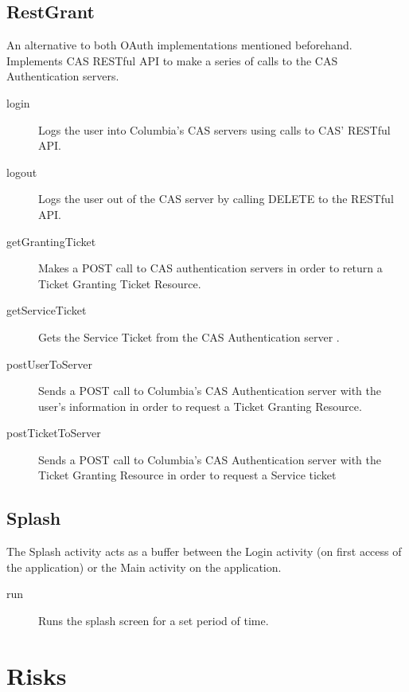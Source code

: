 \documentclass{article}
\begin{document}
\subsection{RestGrant}
An alternative to both OAuth implementations mentioned beforehand. Implements CAS RESTful 
API to make a series of calls to the CAS Authentication servers.
\begin{description}
    \item[login]                Logs the user into Columbia's CAS servers using calls to 
                                CAS' RESTful API.
    \item[logout]               Logs the user out of the CAS server by calling DELETE to 
                                the RESTful API.
    \item[getGrantingTicket]    Makes a POST call to CAS authentication servers in order 
                                to return a Ticket Granting Ticket Resource.
    \item[getServiceTicket]     Gets the Service Ticket from the CAS Authentication server
                                .
    \item[postUserToServer]     Sends a POST call to Columbia's CAS Authentication server
                                with the user's information in order to request a Ticket 
                                Granting Resource.
    \item[postTicketToServer]   Sends a POST call to Columbia's CAS Authentication server 
                                with the Ticket Granting Resource in order to request a 
                                Service ticket
\end{description}

\subsection{Splash} 
The Splash activity acts as a buffer between the Login activity (on first access of the 
application) or the Main activity on the application. 
\begin{description}
    \item[run]      Runs the splash screen for a set period of time.
\end{description}

\section{Risks}
\end{document}
